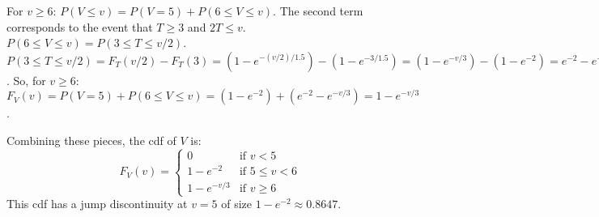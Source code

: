 For $v \ge 6$:
$P(V \le v) = P(V=5) + P(6 \le V \le v)$.
The second term corresponds to the event that $T \ge 3$ and $2T \le v$.
$P(6 \le V \le v) = P(3 \le T \le v/2)$.
$P(3 \le T \le v/2) = F_T(v/2) - F_T(3) = (1 - e^{-(v/2)/1.5}) - (1 - e^{-3/1.5}) = (1 - e^{-v/3}) - (1 - e^{-2}) = e^{-2} - e^{-v/3}$.
So, for $v \ge 6$:
$F_V(v) = P(V=5) + P(6 \le V \le v) = (1 - e^{-2}) + (e^{-2} - e^{-v/3}) = 1 - e^{-v/3}$.

Combining these pieces, the cdf of $V$ is:
\[ F_V(v) = \begin{cases}
0 & \text{if } v < 5 \\
1 - e^{-2} & \text{if } 5 \le v < 6 \\
1 - e^{-v/3} & \text{if } v \ge 6
\end{cases}
\]
This cdf has a jump discontinuity at $v=5$ of size $1-e^{-2} \approx 0.8647$.
